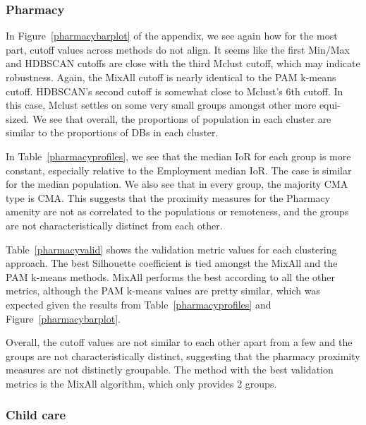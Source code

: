\documentclass[11pt, a4paper]{article}
\begin{document}
\subsubsection{Pharmacy}

In Figure~\ref{pharmacybarplot} of the appendix, we see again how for the most part, cutoff values across methods do not align. It seems like the first Min/Max and HDBSCAN cutoffs are close with the third Mclust cutoff, which may indicate robustness. Again, the MixAll cutoff is nearly identical to the PAM k-means cutoff. HDBSCAN’s second cutoff is somewhat close to Mclust’s 6th cutoff. In this case, Mclust settles on some very small groups amongst other more equi-sized. We see that overall, the proportions of population in each cluster are similar to the proportions of DBs in each cluster.
\par
In Table~\ref{pharmacyprofiles}, we see that the median IoR for each group is more constant, especially relative to the Employment median IoR. The case is similar for the median population. We also see that in every group, the majority CMA type is CMA. This suggests that the proximity measures for the Pharmacy amenity are not as correlated to the populations or remoteness, and the groups are not characteristically distinct from each other.
\par
Table~\ref{pharmacyvalid} shows the validation metric values for each clustering approach. The best Silhouette coefficient is tied amongst the MixAll and the PAM k-means methods. MixAll performs the best according to all the other metrics, although the PAM k-means values are pretty similar, which was expected given the results from Table~\ref{pharmacyprofiles} and Figure~\ref{pharmacybarplot}.
\par
Overall, the cutoff values are not similar to each other apart from a few and the groups are not characteristically distinct, suggesting that the pharmacy proximity measures are not distinctly groupable. The method with the best validation metrics is the MixAll algorithm, which only provides 2 groups.




\subsubsection{Child care}
\end{document}
